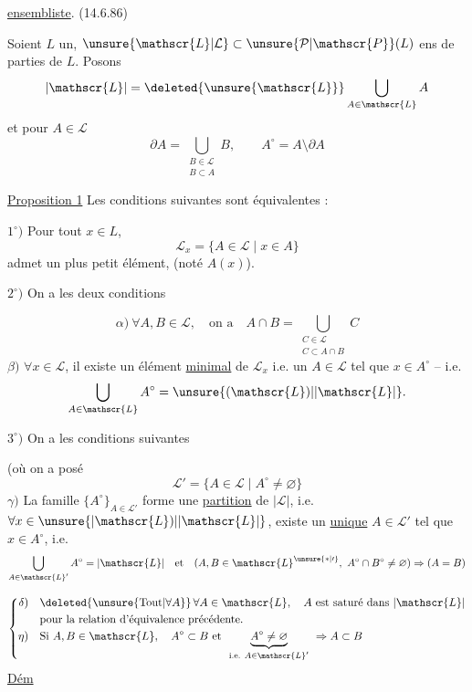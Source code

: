 \uline{ ensembliste}. \quad (14.6.86)

Soient $L$ un, $\unsure{\mathscr{L}|\mathcal{L}}\subset\unsure{\mathcal{P}|\mathscr{P}}(L)$ ens de parties de $L$. Posons
\[
|\mathscr{L}|=\deleted{\unsure{\mathscr{L}}}\bigcup_{A\in\mathscr{L}}A
\]
et pour $A\in\mathscr{L}$
\[
\partial A=\bigcup_{\substack{B\in\mathscr{L}\\B\subset A}}B,\qquad A^\circ=A\setminus\partial A
\]

\uline{Proposition 1} Les conditions suivantes sont équivalentes :

$1^\circ)$ Pour tout $x\in L$,  
\[
\mathscr{L}_x=\{A\in\mathscr{L}\mid x\in A\}
\]
admet un plus petit élément, (noté $A(x)$).

$2^\circ)$ On a les deux conditions

\[
\alpha)\ \forall A,B\in\mathscr{L},\quad\text{on a}\quad
 A\cap B=\bigcup_{\substack{C\in\mathscr{L}\\C\subset A\cap B}}C
\]
$\beta)$ $\forall x\in\mathscr{L}$, il existe un élément \uline{minimal} de $\mathscr{L}_x$ i.e. un $A\in\mathscr{L}$ tel que $x\in A^\circ$ -- i.e.
\[
\bigcup_{A\in\mathscr{L}}A^\circ=\unsure{(\mathscr{L})|\lvert\mathscr{L}\rvert}.
\]

$3^\circ)$ On a les  conditions suivantes

(où  on a posé
\[
\mathscr{L}'=\{A\in\mathscr{L}\mid A^\circ\ne\varnothing\}
\]
$\gamma)$ La famille $\{A^\circ\}_{A\in\mathscr{L}'}$ forme une \uline{partition} de $|\mathscr{L}|$, i.e. $\forall x\in\unsure{\lvert\mathscr{L})|\lvert\mathscr{L}\rvert}$, \deleted{\unsure{\ensuremath{\exists!}}} existe un \uline{unique} $A\in\mathscr{L}'$ tel que $x\in A^\circ$, i.e.
\[
\bigcup_{A\in\mathscr{L}'} A^\circ=|\mathscr{L}|\quad\text{et}\quad
(A,B\in\mathscr{L}^{\unsure{*|\prime}},\ A^\circ\cap B^\circ\ne\varnothing)\Rightarrow(A=B)
\]

\[
\left\{\begin{aligned}
\delta)&\quad \deleted{\unsure{\text{Tout}|\forall A}}\,\forall A\in\mathscr{L},\quad A\ \text{est saturé dans }|\mathscr{L}|\\
 &\quad\text{pour la relation d'équivalence précédente.}\\
\eta)&\quad\text{Si } A,B\in\mathscr{L},\quad A^\circ\subset B\ \text{et }\
 \underset{\text{i.e. } A\in\mathscr{L}'}{\underbrace{A^\circ\ne\varnothing}}\ \Rightarrow A\subset B
\end{aligned}\right.
\]
\uline{Dém}

